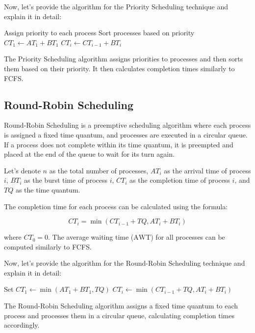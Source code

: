 \documentclass[12pt]{book} %
\begin{document}
Now, let's provide the algorithm for the Priority Scheduling technique and explain it in detail:
\FloatBarrier
\begin{algorithm}[H]
\caption{Priority Scheduling}
\begin{algorithmic}[1]
\State Assign priority to each process
\State Sort processes based on priority
\State $CT_1 \gets AT_1 + BT_1$
    \State $CT_i \gets CT_{i-1} + BT_i$
\EndFor
\end{algorithmic}
\end{algorithm}
\FloatBarrier
The Priority Scheduling algorithm assigns priorities to processes and then sorts them based on their priority. It then calculates completion times similarly to FCFS.

\subsection{Round-Robin Scheduling}

Round-Robin Scheduling is a preemptive scheduling algorithm where each process is assigned a fixed time quantum, and processes are executed in a circular queue. If a process does not complete within its time quantum, it is preempted and placed at the end of the queue to wait for its turn again.

Let's denote $n$ as the total number of processes, $AT_i$ as the arrival time of process $i$, $BT_i$ as the burst time of process $i$, $CT_i$ as the completion time of process $i$, and $TQ$ as the time quantum.

The completion time for each process can be calculated using the formula:

\[
CT_i = \min(CT_{i-1} + TQ, AT_i + BT_i)
\]

where $CT_0 = 0$. The average waiting time ($\text{AWT}$) for all processes can be computed similarly to FCFS.

Now, let's provide the algorithm for the Round-Robin Scheduling technique and explain it in detail:
\FloatBarrier
\begin{algorithm}[H]
\caption{Round-Robin Scheduling}
\begin{algorithmic}[1]
\State Set $CT_1 \gets \min(AT_1 + BT_1, TQ)$
    \State $CT_i \gets \min(CT_{i-1} + TQ, AT_i + BT_i)$
\EndFor
\end{algorithmic}
\end{algorithm}
\FloatBarrier
The Round-Robin Scheduling algorithm assigns a fixed time quantum to each process and processes them in a circular queue, calculating completion times accordingly.
\end{document}
